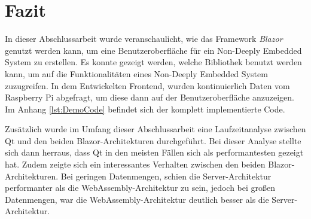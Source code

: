 \chapter{Fazit}
\label{chp:fazit}
In dieser Abschlussarbeit wurde veranschaulicht, wie das Framework \emph{Blazor} genutzt werden
kann, um eine Benutzeroberfläche für ein Non-Deeply Embedded System zu erstellen. Es konnte
gezeigt werden, welche Bibliothek benutzt werden kann, um auf die Funktionalitäten eines
Non-Deeply Embedded System zuzugreifen. In dem Entwickelten Frontend, wurden kontinuierlich Daten
vom Raspberry Pi abgefragt, um diese dann auf der Benutzeroberfläche anzuzeigen. Im Anhang
\ref{lst:DemoCode} befindet sich der komplett implementierte Code.

Zusätzlich wurde im Umfang dieser Abschlussarbeit eine Laufzeitanalyse zwischen Qt und den beiden
Blazor-Architekturen durchgeführt. Bei dieser Analyse stellte sich dann herraus, dass Qt in den
meisten Fällen sich als performantesten gezeigt hat. Zudem zeigte sich ein interessantes
Verhalten zwischen den beiden Blazor-Architekturen. Bei geringen Datenmengen, schien die
Server-Architektur performanter als die WebAssembly-Architektur zu sein, jedoch bei großen
Datenmengen, war die WebAssembly-Architektur deutlich besser als die Server-Architektur.